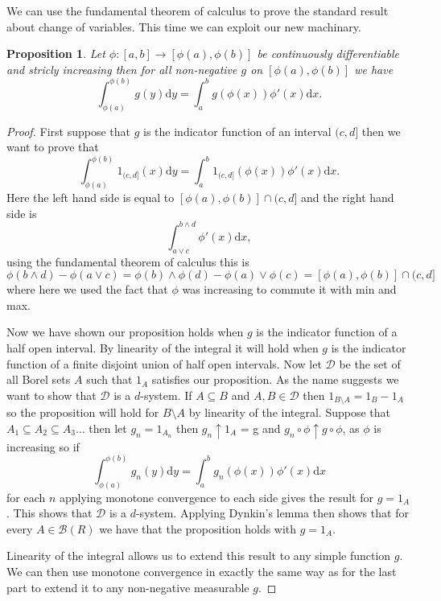 \documentclass[11pt]{article}
\newtheorem{prp}[thm]{Proposition}
\theoremstyle{definition}
\theoremstyle{remark}
\begin{document}
We can use the fundamental theorem of calculus to prove the standard result about change of variables. This time we can exploit our new machinary. 
\begin{prp}
Let $\phi: [a,b] \rightarrow [\phi(a), \phi(b)]$ be continuously differentiable and stricly increasing then for all non-negative $g$ on $[\phi(a), \phi(b)]$ we have
\[ \int_{\phi(a)}^{\phi(b)}g(y) \mathrm{d}y = \int_a^b g(\phi(x)) \phi'(x) \mathrm{d}x. \]
\end{prp}
\begin{proof}
First suppose that $g$ is the indicator function of an interval $(c,d]$ then we want to prove that
\[ \int_{\phi(a)}^{\phi(b)} 1_{(c,d]}(x) \mathrm{d}y = \int_a^b  1_{(c,d]}(\phi(x)) \phi'(x) \mathrm{d}x.\] Here the left hand side is equal to $[\phi(a), \phi(b)] \cap (c,d]$ and the right hand side is 
\[ \int_{a \vee c}^{b \wedge d} \phi'(x) \mathrm{d}x,\] using the fundamental theorem of calculus this is
\[ \phi(b \wedge d) - \phi(a \vee c) = \phi(b) \wedge \phi(d) - \phi(a) \vee \phi(c) = [\phi(a), \phi(b)] \cap (c,d] \] where here we used the fact that $\phi$ was increasing to commute it with min and max.

Now we have shown our proposition holds when $g$ is the indicator function of a half open interval. By linearity of the integral it will hold when $g$ is the indicator function of a finite disjoint union of half open intervals. Now let $\mathcal{D}$ be the set of all  Borel sets $A$ such that $1_A$ satisfies our proposition. As the name suggests we want to show that $\mathcal{D}$ is a $d$-system. If $A \subseteq B$ and $A, B \in \mathcal{D}$ then $1_{B \setminus A} = 1_B - 1_A$ so the proposition will hold for $B \setminus A$ by linearity of the integral. Suppose that $A_1 \subseteq A_2 \subseteq A_3 \dots$ then let $g_n=1_{A_n}$ then $g_n \uparrow 1_A$ = g and $g_n \circ \phi \uparrow g \circ \phi$, as $\phi$ is increasing so if 
\[ \int_{\phi(a)}^{\phi(b)}g_n(y) \mathrm{d}y = \int_a^b g_n(\phi(x)) \phi'(x) \mathrm{d}x \] for each $n$ applying monotone convergence to each side gives the result for $g = 1_A$. This shows that $\mathcal{D}$ is a $d$-system. Applying Dynkin's lemma then shows that for every $A \in \mathcal{B}(R)$ we have that the proposition holds with $g=1_A$.

Linearity of the integral allows us to extend this result to any simple function $g$. We can then use monotone convergence in exactly the same way as for the last part to extend it to any non-negative measurable $g$.
\end{proof}
\end{document}
